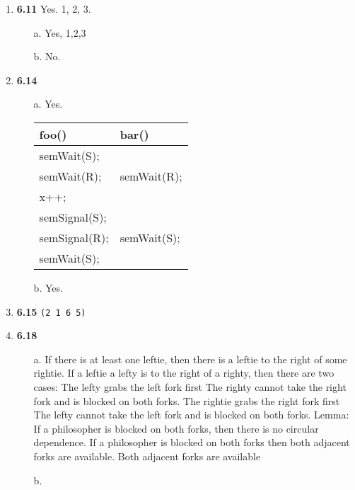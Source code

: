 \documentclass{article}
\begin{document}
\begin{enumerate}
\item{\textbf{6.11}}
Yes. 1, 2, 3.
\begin{enumerate}
\item[a.]
Yes, 1,2,3

\item[b.]
No.

\end{enumerate}

\item{\textbf{6.14}}
\begin{enumerate}
\item[a.]
Yes. 
\begin{tabular}{l l}
\textbf{foo()} & \textbf{bar()} \\ \hline
semWait(S); & \\
semWait(R); & semWait(R); \\
x++; & \\
semSignal(S); & \\
semSignal(R); & semWait(S); \\
semWait(S); &  \\
\end{tabular}

\item[b.]
Yes.

\end{enumerate}

\item{\textbf{6.15}}
\texttt{(2 1 6 5)}

\item{\textbf{6.18}}
\begin{enumerate}
\item[a.]
If there is at least one leftie, then there is a leftie to the right of some rightie.
If a leftie a lefty is to the right of a righty, then there are two cases:
  The lefty grabs the left fork first
    The righty cannot take the right fork and is blocked on both forks.
  The rightie grabs the right fork first
    The lefty cannot take the left fork and is blocked on both forks.
Lemma:
If a philosopher is blocked on both forks, then there is no circular dependence.
  If a philosopher is blocked on both forks then both adjacent forks are available.
  Both adjacent forks are available

\item[b.]


\end{enumerate}

\end{enumerate}
\end{document}
